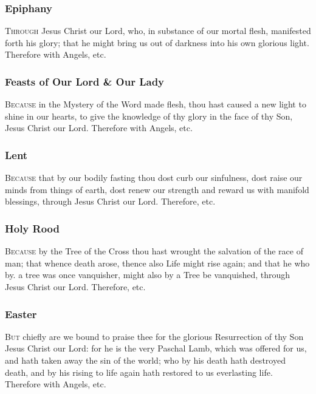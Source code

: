 \subsubsection{Epiphany}
\textsc{Through} Jesus Christ our Lord, who, in substance of our mortal flesh, manifested forth his glory; that he might bring us out of darkness into his own glorious light. 
    Therefore with Angels, etc.
\subsubsection{Feasts of Our Lord \& Our Lady}
\textsc{Because} in the Mystery of the Word made flesh, thou hast caused a new light to shine in our hearts, to give the knowledge of thy glory in the face of thy Son, Jesus Christ our Lord.
    Therefore with Angels, etc.
\subsubsection{Lent}
\textsc{Because} that by our bodily fasting thou dost curb our sinfulness, dost raise our minds from things of earth, dost renew our strength and reward us with manifold blessings, through Jesus Christ our Lord. Therefore, etc.
\subsubsection{Holy Rood}
\textsc{Because} by the Tree of the Cross thou hast wrought the salvation of the race of man; that whence death arose, thence also Life might rise again; and that he who by. a tree was once vanquisher, might also by a Tree be vanquished, through Jesus Christ our Lord. Therefore, etc.
\subsubsection{Easter}
\textsc{But} chiefly are we bound to praise thee for the glorious Resurrection of thy Son Jesus Christ our Lord: for he is the very Paschal Lamb, which was offered for us, and hath taken away the sin of the world; who by his death hath destroyed death, and by his rising to life again hath restored to us everlasting life. 
    Therefore with Angels, etc.

